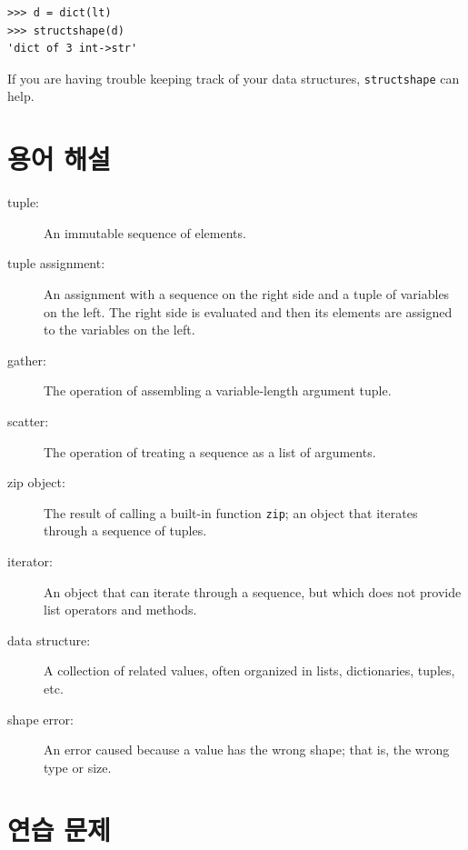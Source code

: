 \documentclass[10pt]{book}
\begin{document}
\begin{verbatim}
>>> d = dict(lt) 
>>> structshape(d)
'dict of 3 int->str'
\end{verbatim}
%
If you are having trouble keeping track of your data structures,
{\tt structshape} can help.


\section{용어 해설}

\begin{description}

\item[tuple:] An immutable sequence of elements.

\item[tuple assignment:] An assignment with a sequence on the
right side and a tuple of variables on the left.  The right
side is evaluated and then its elements are assigned to the
variables on the left.

\item[gather:] The operation of assembling a variable-length
argument tuple.

\item[scatter:] The operation of treating a sequence as a list of
arguments.

\item[zip object:] The result of calling a built-in function {\tt zip};
an object that iterates through a sequence of tuples.

\item[iterator:] An object that can iterate through a sequence, but
which does not provide list operators and methods.

\item[data structure:] A collection of related values, often
organized in lists, dictionaries, tuples, etc.

\item[shape error:] An error caused because a value has the
wrong shape; that is, the wrong type or size.

\end{description}


\section{연습 문제}
\end{document}
